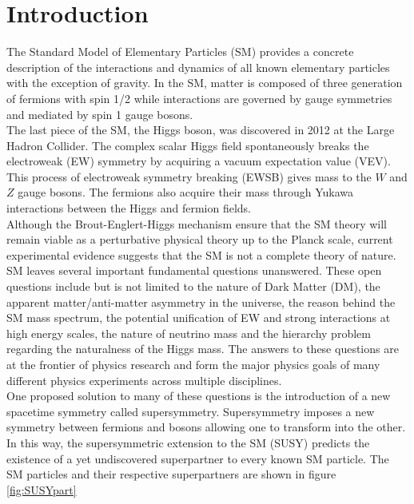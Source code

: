 \chapter{Introduction}
\label{introduction}

\indent The Standard Model of Elementary Particles (SM) provides a concrete description of the interactions and dynamics of all known elementary particles with the exception of gravity.  In the SM, matter is composed of three generation of fermions with spin 1/2 while interactions are governed by gauge symmetries and mediated by spin 1 gauge bosons.  \\

\indent The last piece of the SM, the Higgs boson, was discovered in 2012 at the Large Hadron Collider.  The complex scalar Higgs field spontaneously breaks the electroweak (EW) symmetry by acquiring a vacuum expectation value (VEV). This process of electroweak symmetry breaking (EWSB) gives mass to the $W$ and $Z$ gauge bosons. The fermions also acquire their mass through Yukawa interactions between the Higgs and fermion fields. \\

\indent Although the Brout-Englert-Higgs mechanism ensure that the SM theory will remain viable as a perturbative physical theory up to the Planck scale, current experimental evidence suggests that the SM is not a complete theory of nature.  SM leaves several important fundamental questions unanswered.  These open questions include but is not limited to the nature of Dark Matter (DM), the apparent matter/anti-matter asymmetry in the universe,  the reason behind the SM mass spectrum, the potential unification of EW and strong interactions at high energy scales, the nature of neutrino mass and the hierarchy problem regarding the naturalness of the Higgs mass.  The answers to these questions are at the frontier of physics research and form the major physics goals of many different physics experiments across multiple disciplines. \\

\indent One proposed solution to many of these questions is the introduction of a new spacetime symmetry called supersymmetry.  Supersymmetry imposes a new symmetry between fermions and bosons allowing one to transform into the other.  In this way, the supersymmetric extension to the SM (SUSY) predicts the existence of a yet undiscovered superpartner to every known SM particle.  The SM particles and their respective superpartners are shown in figure \ref{fig:SUSYpart} \\

